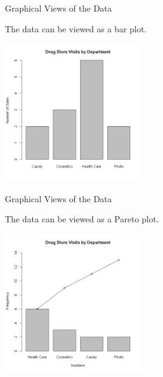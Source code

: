 \begin{frame}{Graphical Views of the Data}

  The data can be viewed as a bar plot.

  \includegraphics[width=6cm]{img/drugStoreBarPlot}
  
\end{frame}

\begin{frame}{Graphical Views of the Data}

  The data can be viewed as a Pareto plot.

  \includegraphics[width=6cm]{img/drugStorePareto}
  
\end{frame}


